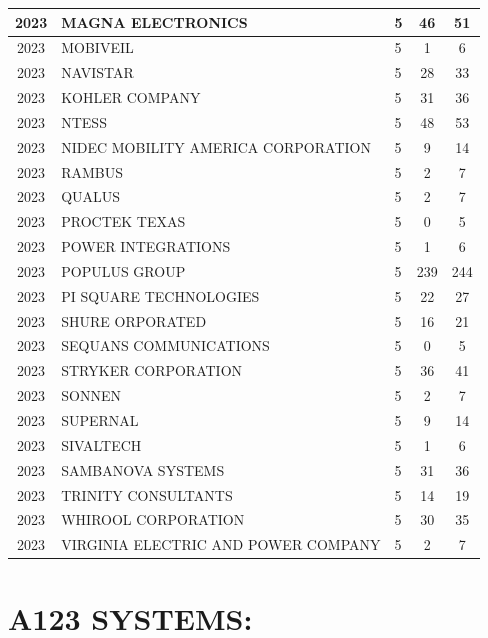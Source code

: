 \documentclass{article}%
\begin{document}
\begin{longtable}{c|p{20em}|p{5em}|c|c}
\hline%
2023&MAGNA ELECTRONICS&5&46&51\\%
\hline%
2023&MOBIVEIL&5&1&6\\%
\hline%
2023&NAVISTAR&5&28&33\\%
\hline%
2023&KOHLER COMPANY&5&31&36\\%
\hline%
2023&NTESS&5&48&53\\%
\hline%
2023&NIDEC MOBILITY AMERICA CORPORATION&5&9&14\\%
\hline%
2023&RAMBUS&5&2&7\\%
\hline%
2023&QUALUS&5&2&7\\%
\hline%
2023&PROCTEK TEXAS&5&0&5\\%
\hline%
2023&POWER INTEGRATIONS&5&1&6\\%
\hline%
2023&POPULUS GROUP&5&239&244\\%
\hline%
2023&PI SQUARE TECHNOLOGIES&5&22&27\\%
\hline%
2023&SHURE ORPORATED&5&16&21\\%
\hline%
2023&SEQUANS COMMUNICATIONS&5&0&5\\%
\hline%
2023&STRYKER CORPORATION&5&36&41\\%
\hline%
2023&SONNEN&5&2&7\\%
\hline%
2023&SUPERNAL&5&9&14\\%
\hline%
2023&SIVALTECH&5&1&6\\%
\hline%
2023&SAMBANOVA SYSTEMS&5&31&36\\%
\hline%
2023&TRINITY CONSULTANTS&5&14&19\\%
\hline%
2023&WHIROOL CORPORATION&5&30&35\\%
\hline%
2023&VIRGINIA ELECTRIC AND POWER COMPANY&5&2&7\\%
\hline%
\end{longtable}

%
\section{A123 SYSTEMS:}%
\label{sec:A123SYSTEMS}%
\end{document}
